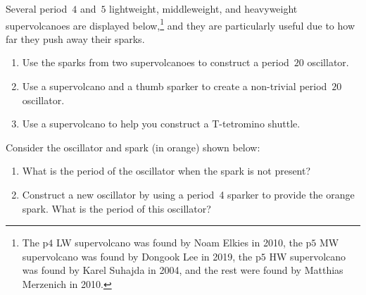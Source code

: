 \begin{multicols}{2}
	
	\mfilbreak
	
	
	\begin{problem}\label{exer:volcanoes}
		Several period~$4$ and~$5$ lightweight, middleweight, and heavyweight supervolcanoes are displayed below,\footnote{The p$4$ LW supervolcano was found by Noam Elkies in 2010, the p$5$ MW supervolcano was found by Dongook Lee in 2019, the p$5$ HW supervolcano was found by Karel Suhajda in 2004, and the rest were found by Matthias Merzenich in 2010.} and they are particularly useful due to how far they push away their sparks.
		
		\begin{center}
		\end{center}
		
		\begin{enumerate}[label=\bf\color{ocre}(\alph*)]
			\item {} Use the sparks from two supervolcanoes to construct a period~$20$ oscillator.
			
			\item {} Use a supervolcano and a thumb sparker to create a non-trivial period~$20$ oscillator.
			
			\item {} Use a supervolcano to help you construct a T-tetromino shuttle.
		\end{enumerate}
	\end{problem}


	\mfilbreak
	
	
	\begin{problemstar}\label{exer:phase_shift_oscillator}
		Consider the oscillator and spark (in orange) shown below:
		
		\begin{center}
		\end{center}
		
		\begin{enumerate}[label=\bf\color{ocre}(\alph*)]
			\item {} What is the period of the oscillator when the spark is not present?
			
			\item {} Construct a new oscillator by using a period~4 sparker to provide the orange spark. What is the period of this oscillator?
			

\end{enumerate}
\end{problemstar}
\end{multicols}
